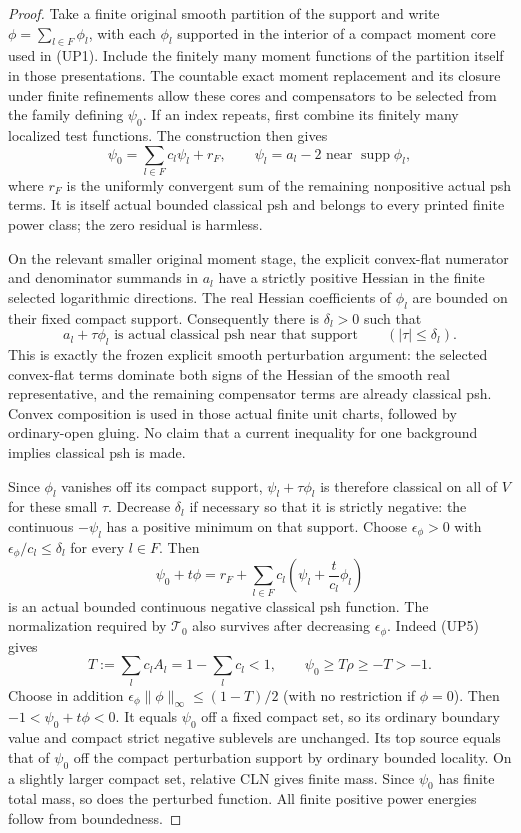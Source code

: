 \begin{proof}
Take a finite original smooth partition of the support and
write $\phi=\sum_{l\in F}\phi_l$, with each $\phi_l$
supported in the interior of a compact moment core used
in \textup{(UP1)}.  Include the finitely many moment
functions of the partition itself in those presentations.
The countable exact moment replacement and its closure under
finite refinements allow these cores and compensators to
be selected from the family defining $\psi_0$.
If an index repeats, first combine its finitely many
localized test functions.  The construction then gives
\[
 \psi_0=\sum_{l\in F}c_l\psi_l+r_F,
 \qquad \psi_l=a_l-2\text{ near }\operatorname{supp}\phi_l,
 \tag{NP3}
\]
where $r_F$ is the uniformly convergent sum of the remaining
nonpositive actual psh terms.  It is itself actual bounded
classical psh and belongs to every printed finite power class;
the zero residual is harmless.

On the relevant smaller original moment stage, the explicit
convex-flat numerator and denominator summands in $a_l$
have a strictly positive Hessian in the finite selected
logarithmic directions.  The real Hessian coefficients of
$\phi_l$ are bounded on their fixed compact support.
Consequently there is $\delta_l>0$ such that
\[
                     a_l+\tau\phi_l
             \text{ is actual classical psh near that support}
                  \qquad(|\tau|\le\delta_l).
 \tag{NP4}
\]
This is exactly the frozen explicit smooth perturbation
argument: the selected convex-flat terms dominate both
signs of the Hessian of the smooth real representative,
and the remaining compensator terms are already classical
psh.  Convex composition is used in those actual finite
unit charts, followed by ordinary-open gluing.  No claim
that a current inequality for one background implies
classical psh is made.

Since $\phi_l$ vanishes off its compact support,
$\psi_l+\tau\phi_l$ is therefore classical on all of
$V$ for these small $\tau$.  Decrease $\delta_l$ if
necessary so that it is strictly negative: the continuous
$-\psi_l$ has a positive minimum on that support.
Choose $\epsilon_\phi>0$ with
$\epsilon_\phi/c_l\le\delta_l$ for every $l\in F$.
Then
\[
     \psi_0+t\phi
       =r_F+\sum_{l\in F}c_l
                    \left(\psi_l+\frac{t}{c_l}\phi_l\right)
 \tag{NP5}
\]
is an actual bounded continuous negative classical psh
function.  The normalization required by $\mathscr T_0$
also survives after decreasing $\epsilon_\phi$.
Indeed \textup{(UP5)} gives
\[
 T:=\sum_l c_lA_l=1-\sum_lc_l<1,
       \qquad\psi_0\ge T\rho\ge-T>-1.
\]
Choose in addition
$\epsilon_\phi\|\phi\|_\infty\le(1-T)/2$
(with no restriction if $\phi=0$).  Then
$-1<\psi_0+t\phi<0$.  It equals $\psi_0$ off a fixed compact set,
so its ordinary boundary value and compact strict negative
sublevels are unchanged.  Its top source equals that of
$\psi_0$ off the compact perturbation support by ordinary
bounded locality.  On a slightly larger compact set,
relative CLN gives finite mass.  Since $\psi_0$ has
finite total mass, so does the perturbed function.  All
finite positive power energies follow from boundedness.


\end{proof}
